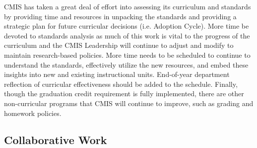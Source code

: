 \documentclass{report}
\begin{document}
\begin{findings}

CMIS has taken a great deal of effort into assessing its curriculum and standards by providing time and resources in unpacking the standards and providing a strategic plan for future curricular decisions (i.e. Adoption Cycle). More time be devoted to standards analysis as much of this work is vital to the progress of the curriculum and the CMIS Leadership will continue to adjust and modify to maintain research-based policies. More time needs to be scheduled to continue to understand the standards, effectively utilize the new resources, and embed these insights into new and existing instructional units. End-of-year department reflection of curricular effectiveness should be added to the schedule. Finally, though the graduation credit requirement is fully implemented, there are other non-curricular programs that CMIS will continue to improve, such as grading and homework policies.
\end{findings}

\subsection{Collaborative Work}


\end{document}
